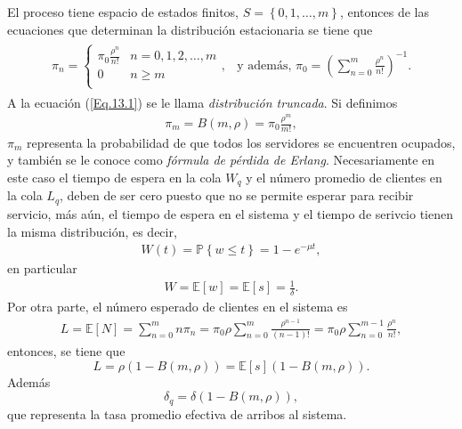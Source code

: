 \documentclass{article}
\newcommand{\esp}{\mathbb{E}}
\newcommand{\prob}{\mathbb{P}}
\numberwithin{equation}{section}
\begin{document}
El proceso tiene espacio de estados finitos, $S=\left\{0,1,\ldots,m\right\}$, entonces de las ecuaciones que determinan la distribuci\'on estacionaria se tiene que
\begin{eqnarray}\label{Eq.13.1}
\begin{array}{ll}
\pi_{n}=\left\{\begin{array}{cc}
\pi_{0}\frac{\rho^{n}}{n!} & n=0,1,2,\ldots,m\\
0 & n\geq m\\
\end{array}
\right.,&
\textrm{y adem\'as, }
\pi_{0}=\left(\sum_{n=0}^{m}\frac{\rho^{n}}{n!}\right)^{-1}.
\end{array}
\end{eqnarray}
A la ecuaci\'on (\ref{Eq.13.1}) se le llama {\em distribuci\'on truncada}. Si definimos 
\begin{eqnarray}
\pi_{m}=B\left(m,\rho\right)=\pi_{0}\frac{\rho^{m}}{m!},
\end{eqnarray}
$\pi_{m}$ representa la probabilidad de que todos los servidores se encuentren ocupados, y tambi\'en se le conoce como {\em f\'ormula de p\'erdida de Erlang}. Necesariamente en este caso el tiempo de espera en la cola $W_{q}$ y el n\'umero promedio de clientes en la cola $L_{q}$, deben de ser cero puesto que no se permite esperar para recibir servicio, m\'as a\'un, el tiempo de espera en el sistema y el tiempo de serivcio tienen la misma distribuci\'on, es decir,
\begin{eqnarray}
W\left(t\right)=\prob\left\{w\leq t\right\}=1-e^{-\mu t},
\end{eqnarray}
en particular
\begin{eqnarray}
W=\esp\left[w\right]=\esp\left[s\right]=\frac{1}{\delta}.
\end{eqnarray}
Por otra parte, el n\'umero esperado de clientes en el sistema es
\begin{eqnarray}
L=\esp\left[N\right]=\sum_{n=0}^{m}n\pi_{n}=\pi_{0}\rho\sum_{n=0}^{m}\frac{\rho^{n-1}}{\left(n-1\right)!}=\pi_{0}\rho\sum_{n=0}^{m-1}\frac{\rho^{n}}{n!},
\end{eqnarray}
entonces, se tiene que
\begin{equation}
L=\rho\left(1-B\left(m,\rho\right)\right)=\esp\left[s\right]\left(1-B\left(m,\rho\right)\right).
\end{equation}
Adem\'as
\begin{equation}
\delta_{q}=\delta\left(1-B\left(m,\rho\right)\right),
\end{equation}
que representa la tasa promedio efectiva de arribos al sistema.
\end{document}
